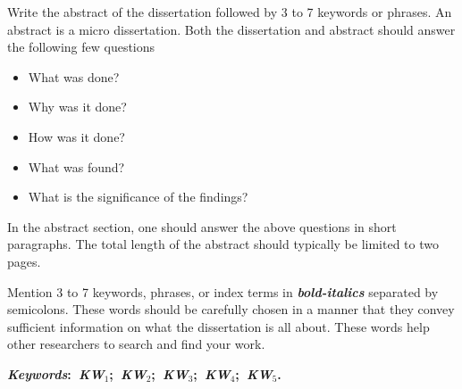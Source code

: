 \thispagestyle{empty} 
\noindent Write the abstract of the dissertation followed by 3 to 7 keywords or phrases. An abstract is a micro dissertation. Both the dissertation and abstract should answer the following few questions \textemdash
\begin{itemize}
\item What was done?
\item Why was it done?
\item How was it done?
\item What was found?
\item What is the significance of the findings?
\end{itemize}
In the abstract section, one should answer the above questions in short paragraphs. The total length of the abstract should typically be limited to two pages.

\vspace{5mm}
Mention 3 to 7 keywords, phrases, or index terms in \textit{\textbf{bold-italics}} separated by semicolons. These words should be carefully chosen in a manner that they convey sufficient information on what the dissertation is all about. These words help other researchers to search and find your work.

\vspace{5mm}
\noindent\textbf{\textit{Keywords}:~\textit{KW$_1$};~\textit{KW$_2$};~\textit{KW$_3$};~\textit{KW$_4$};~\textit{KW$_5$}.}
